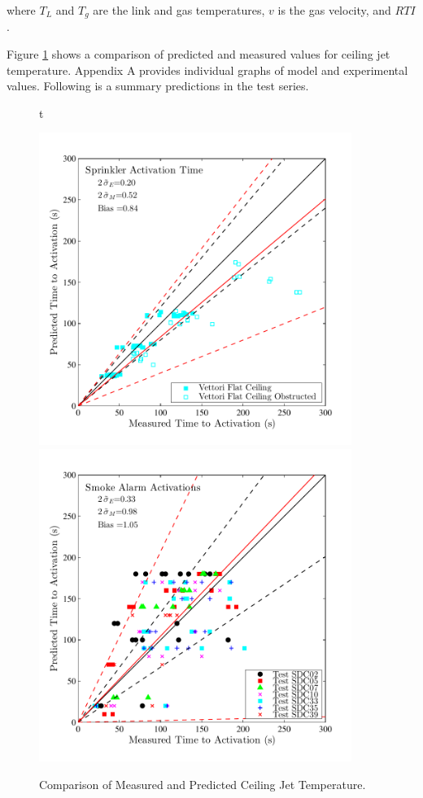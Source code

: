 where $T_L$ and $T_g$ are the link and gas temperatures, $v$ is the gas velocity, and $RTI$.

Figure \ref{fig:Activation_Scatter} shows a comparison of predicted and measured values for ceiling jet temperature. Appendix A provides individual graphs of model and experimental values. Following is a summary  predictions in the test series.

\begin{figure}{t}
\begin{center}
\includegraphics[width=4.0in]{FIGURES/ScatterPlots/Sprinkler_Activation_Time}  \\
\includegraphics[width=4.0in]{FIGURES/ScatterPlots/Smoke_Alarm_Activation_Time}
\end{center}
\caption{Comparison of Measured and Predicted Ceiling Jet Temperature.} \label{fig:Activation_Scatter}
\end{figure}

